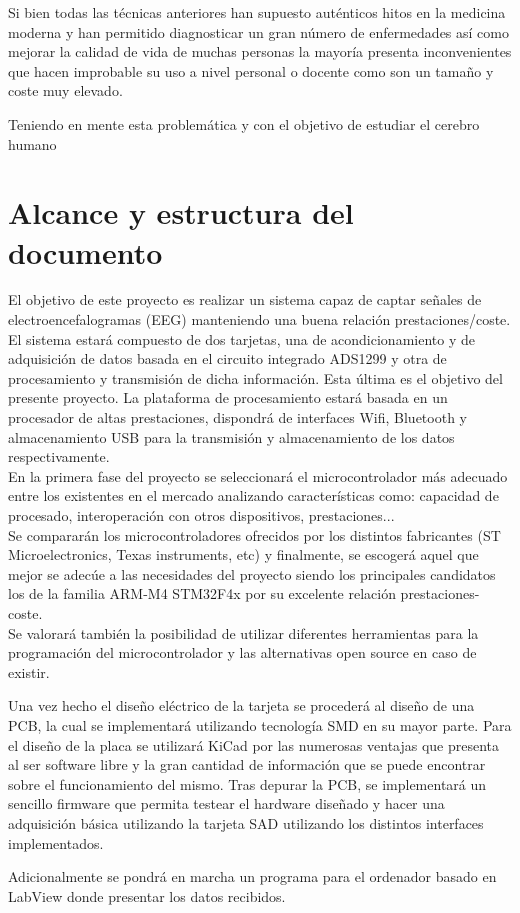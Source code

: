 Si bien todas las técnicas anteriores han supuesto auténticos hitos en la medicina moderna y han permitido diagnosticar un gran número de enfermedades así como mejorar la calidad de vida de muchas personas la mayoría presenta inconvenientes que hacen improbable su uso a nivel personal o docente como son un tamaño y coste muy elevado.

Teniendo en mente esta problemática y con el objetivo de estudiar el cerebro humano 

\section{Alcance y estructura del documento}

El objetivo de este proyecto es realizar un sistema capaz de captar señales de electroencefalogramas (EEG) manteniendo una buena relación prestaciones/coste. El sistema estará compuesto de dos tarjetas, una de acondicionamiento y de adquisición de datos basada en el circuito integrado ADS1299 y otra de procesamiento y transmisión de dicha información. Esta última es el objetivo del presente proyecto. La plataforma de procesamiento estará basada en un procesador de altas prestaciones, dispondrá de interfaces Wifi, Bluetooth y almacenamiento USB para la transmisión y almacenamiento de los datos respectivamente. 
\\En la primera fase del proyecto se seleccionará el microcontrolador más adecuado entre los existentes en el mercado analizando características como: capacidad de procesado, interoperación con otros dispositivos, prestaciones...
\\Se compararán los microcontroladores ofrecidos por los distintos fabricantes (ST Microelectronics, Texas instruments, etc) y finalmente, se escogerá aquel que mejor se adecúe a las necesidades del proyecto siendo los principales candidatos los de la familia ARM-M4 STM32F4x por su excelente relación prestaciones-coste.
\\Se valorará también la posibilidad de utilizar diferentes herramientas para la programación del microcontrolador y las alternativas open source en caso de existir.

Una vez hecho el diseño eléctrico de la tarjeta se procederá al diseño de una PCB, la cual se implementará utilizando tecnología SMD en su mayor parte. Para el diseño de la placa se utilizará KiCad por las numerosas ventajas que presenta al ser software libre y la gran cantidad de información que se puede encontrar sobre el funcionamiento del mismo.
Tras depurar la PCB, se implementará un sencillo firmware que permita testear el hardware diseñado y hacer una adquisición básica utilizando la tarjeta SAD utilizando los distintos interfaces implementados.

Adicionalmente se pondrá en marcha un programa para el ordenador basado en LabView donde presentar los datos recibidos.
